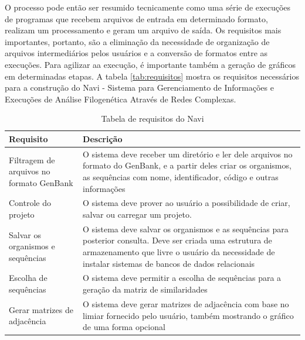 O processo pode então ser resumido tecnicamente como uma série de execuções de programas que recebem arquivos de entrada em determinado formato, realizam um
processamento e geram um arquivo de saída. Os requisitos mais importantes, portanto, são a eliminação da necessidade de organização de arquivos intermediários
pelos usuários e a conversão de formatos entre as execuções. Para agilizar aa execução, é importante também a geração de gráficos em determinadas etapas. A
tabela \ref{tab:requisitos} mostra os requisitos necessários para a construção do Navi - Sistema para Gerenciamento de Informações e Execuções de Análise
Filogenética Através de Redes Complexas.

\begin{table}
\centering
\caption{Tabela de requisitos do Navi} %
\begin{tabular}{p{5cm}p{10cm}} %
\hline 
Requisito & Descrição \\ 
\hline
\hline
Filtragem de arquivos no formato GenBank & O sistema deve receber um diretório e ler dele arquivos no formato do GenBank, e a partir deles criar os organismos,
as sequências com nome, identificador, código e outras informações\\ \hline
Controle do projeto & O sistema deve prover ao usuário a possibilidade de criar, salvar ou carregar um projeto. \\ \hline
Salvar os organismos e sequências & O sistema deve salvar os organismos e as sequências para posterior consulta. Deve ser criada uma estrutura de
armazenamento que livre o usuário da necessidade de instalar sistemas de bancos de dados relacionais \\ \hline
Escolha de sequências & O sistema deve permitir a escolha de sequências para a geração da matriz de similaridades \\ \hline
Gerar matrizes de adjacência & O sistema deve gerar matrizes de adjacência com base no limiar fornecido pelo usuário, também mostrando o gráfico de uma
forma opcional \\ \hline

\end{tabular}
\end{table}
